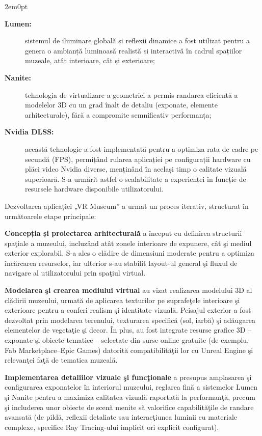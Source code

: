 \begin{adjustwidth}{2em}{0pt}
\begin{description}
\item[\textbf{Lumen:}] sistemul de iluminare globală și reflexii dinamice a fost utilizat pentru a genera o ambianță luminoasă realistă și interactivă în cadrul spațiilor muzeale, atât interioare, cât și exterioare; 
    
\item[\textbf{Nanite: }] tehnologia de virtualizare a geometriei a permis randarea eficientă a modelelor 3D cu un grad înalt de detaliu (exponate, elemente arhitecturale), fără a compromite semnificativ performanța; 

\item[\textbf{Nvidia DLSS: }] această tehnologie a fost implementată pentru a optimiza rata de cadre pe secundă (FPS), permițând rularea aplicației pe configurații hardware cu plăci video Nvidia diverse, menținând în același timp o calitate vizuală superioară. S-a urmărit astfel o scalabilitate a experienței în funcție de resursele hardware disponibile utilizatorului.
\end{description}
\end{adjustwidth}


\noindent Dezvoltarea aplicației „VR Museum” a urmat un proces iterativ, structurat în următoarele etape principale:

\noindent\textbf{Concepția și proiectarea arhitecturală} a început cu definirea structurii spaţiale a muzeului, incluzând atât zonele interioare de expunere, cât şi mediul exterior explorabil. S-a ales o clădire de dimensiuni moderate pentru a optimiza încărcarea resurselor, iar ulterior s-au stabilit layout-ul general şi fluxul de navigare al utilizatorului prin spaţiul virtual.

\noindent\textbf{Modelarea şi crearea mediului virtual} au vizat realizarea modelului 3D al clădirii muzeului, urmată de aplicarea texturilor pe suprafeţele interioare şi exterioare pentru a conferi realism şi identitate vizuală. Peisajul exterior a fost dezvoltat prin modelarea terenului, texturarea specifică (sol, iarbă) şi adăugarea elementelor de vegetaţie şi decor. În plus, au fost integrate resurse grafice 3D – exponate şi obiecte tematice – selectate din surse online gratuite (de exemplu, Fab Marketplace–Epic Games) datorită compatibilităţii lor cu Unreal Engine şi relevanţei faţă de tematica muzeală.

\noindent\textbf{Implementarea detaliilor vizuale şi funcţionale} a presupus amplasarea şi configurarea exponatelor în interiorul muzeului, reglarea fină a sistemelor Lumen şi Nanite pentru a maximiza calitatea vizuală raportată la performanţă, precum şi includerea unor obiecte de scenă menite să valorifice capabilităţile de randare avansată (de pildă, reflexii detaliate sau interacţiunea luminii cu materiale complexe, specifice Ray Tracing-ului implicit ori explicit configurat).

